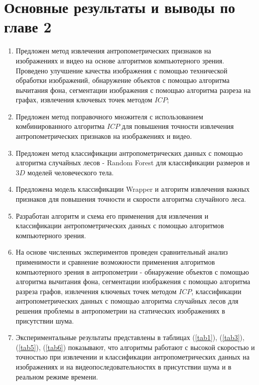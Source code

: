 \section{Основные результаты и выводы по главе 2}

\begin{enumerate}
	\item Предложен метод извлечения антропометрических признаков на изображениях и видео на основе алгоритмов компьютерного зрения. Проведено улучшение качества изображения с помощью технической обработки изображений, обнаружение объектов с помощью алгоритма вычитания фона, сегментации изображения с помощью алгоритма разреза на графах, извлечения ключевых точек методом $ICP$;
 \item Предложен метод поправочного множителя с использованием комбинированного алгоритма $ICP$ для повышения точности извлечения антропометрических признаков на изображениях и видео.
\item Предложен метод классификации антропометрических данных с помощью алгоритма случайных лесов - Random Forest для классификации размеров и $3D$ моделей человеческого тела.
\item Предложена модель классификации Wrapper и алгоритм извлечения важных признаков для повышения точности и скорости алгоритма случайного леса.
\item Разработан алгоритм и схема его применения для извлечения и классификации антропометрических данных с помощью алгоритмов компьютерного зрения.
\item На основе численных экспериментов проведен сравнительный анализ применимости и сравнение возможности применения алгоритмов компьютерного зрения в антропометрии - обнаружение объектов с помощью алгоритма вычитания фона, сегментации изображения с помощью алгоритма разреза графов, извлечения ключевых точек методом $ICP$, классификации антропометрических данных с помощью алгоритма случайных лесов для решения проблемы в  антропометрии на статических изображениях в присутствии шума. 
\item Экспериментальные результаты представлены в таблицах (\ref{tab1}), (\ref{tab3}), (\ref{tab5}), (\ref{tab6}) показывают, что алгоритмы работают с высокой скоростью и точностью при извлечении и классификации антропометрических данных на изображениях и на видеопоследовательностях в присутствии шума и в реальном режиме времени. 

\end{enumerate}
